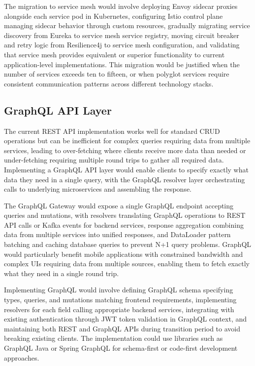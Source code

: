 The migration to service mesh would involve deploying Envoy sidecar proxies alongside each service pod in Kubernetes, configuring Istio control plane managing sidecar behavior through custom resources, gradually migrating service discovery from Eureka to service mesh service registry, moving circuit breaker and retry logic from Resilience4j to service mesh configuration, and validating that service mesh provides equivalent or superior functionality to current application-level implementations. This migration would be justified when the number of services exceeds ten to fifteen, or when polyglot services require consistent communication patterns across different technology stacks.

\subsection{GraphQL API Layer}

The current REST API implementation works well for standard CRUD operations but can be inefficient for complex queries requiring data from multiple services, leading to over-fetching where clients receive more data than needed or under-fetching requiring multiple round trips to gather all required data. Implementing a GraphQL API layer would enable clients to specify exactly what data they need in a single query, with the GraphQL resolver layer orchestrating calls to underlying microservices and assembling the response.

The GraphQL Gateway would expose a single GraphQL endpoint accepting queries and mutations, with resolvers translating GraphQL operations to REST API calls or Kafka events for backend services, response aggregation combining data from multiple services into unified responses, and DataLoader pattern batching and caching database queries to prevent N+1 query problems. GraphQL would particularly benefit mobile applications with constrained bandwidth and complex UIs requiring data from multiple sources, enabling them to fetch exactly what they need in a single round trip.

Implementing GraphQL would involve defining GraphQL schema specifying types, queries, and mutations matching frontend requirements, implementing resolvers for each field calling appropriate backend services, integrating with existing authentication through JWT token validation in GraphQL context, and maintaining both REST and GraphQL APIs during transition period to avoid breaking existing clients. The implementation could use libraries such as GraphQL Java or Spring GraphQL for schema-first or code-first development approaches.

